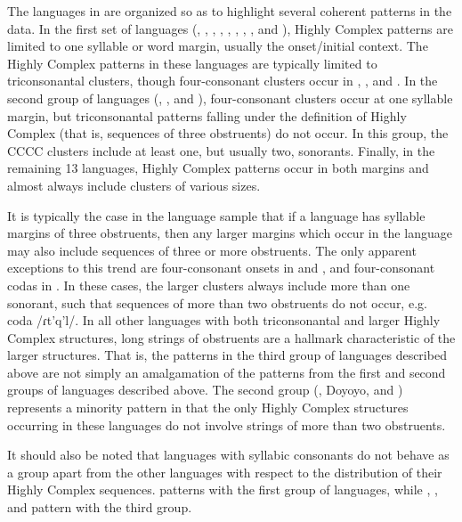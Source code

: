   The languages in  are organized so as to highlight several coherent patterns in the data. In the first set of languages (, , , , , , , , and ), Highly Complex patterns are limited to one syllable or word margin, usually the onset/initial context. The Highly Complex patterns in these languages are typically limited to triconsonantal clusters, though four-consonant clusters occur in , , and . In the second group of languages (, , and ), four-consonant clusters occur at one syllable margin, but triconsonantal patterns falling under the definition of Highly Complex (that is, sequences of three obstruents) do not occur. In this group, the CCCC clusters include at least one, but usually two, sonorants. Finally, in the remaining 13 languages, Highly Complex patterns occur in both margins and almost always include clusters of various sizes.

  It is typically the case in the language sample that if a language has syllable margins of three obstruents, then any larger margins which occur in the language may also include sequences of three or more obstruents. The only apparent exceptions to this trend are four-consonant onsets in  and , and four-consonant codas in . In these cases, the larger clusters always include more than one sonorant, such that sequences of more than two obstruents do not occur, e.g.  coda /ɾt’q’l/. In all other languages with both triconsonantal and larger Highly Complex structures, long strings of obstruents are a hallmark characteristic of the larger structures. That is, the patterns in the third group of languages described above are not simply an amalgamation of the patterns from the first and second groups of languages described above. The second group (, Doyoyo, and ) represents a minority pattern in that the only Highly Complex structures occurring in these languages do not involve strings of more than two obstruents.

  It should also be noted that languages with syllabic consonants do not behave as a group apart from the other languages with respect to the distribution of their Highly Complex sequences.  patterns with the first group of languages, while , , and  pattern with the third group.

